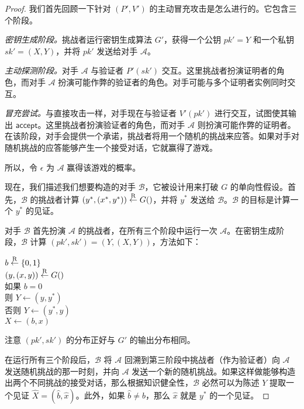 \begin{proof}
我们首先回顾一下针对 $(P',V')$ 的主动冒充攻击是怎么进行的。它包含三个阶段。

\emph{密钥生成阶段。}挑战者运行密钥生成算法 $G'$，获得一个公钥 $pk'=Y$ 和一个私钥 $sk'=(X,Y)$，并将 $pk'$ 发送给对手 $\mathcal{A}$。

\emph{主动探测阶段。}对手 $\mathcal{A}$ 与验证者 $P'(sk')$ 交互。这里挑战者扮演证明者的角色，而对手 $\mathcal{A}$ 扮演可能作弊的验证者的角色。对手可能与多个证明者实例同时交互。

\emph{冒充尝试。}与直接攻击一样，对手现在与验证者 $V'(pk')$ 进行交互，试图使其输出 $\mathsf{accept}$。这里挑战者扮演验证者的角色，而对手 $\mathcal{A}$ 则扮演可能作弊的证明者。在该阶段，对手会提供一个承诺，挑战者将用一个随机的挑战来应答。如果对手对随机挑战的应答能够产生一个接受对话，它就赢得了游戏。

所以，令 $\epsilon$ 为 $\mathcal{A}$ 赢得该游戏的概率。

现在，我们描述我们想要构造的对手 $\mathcal{B}$，它被设计用来打破 $G$ 的单向性假设。首先，$\mathcal{B}$ 的挑战者计算 $(y^*,(x^*,y^*))\overset{\rm R}\leftarrow G()$，并将 $y^*$ 发送给 $\mathcal{B}$。$\mathcal{B}$ 的目标是计算一个 $y^*$ 的见证。

对手 $\mathcal{B}$ 首先扮演 $\mathcal{A}$ 的挑战者，在所有三个阶段中运行一次 $\mathcal{A}$。在密钥生成阶段，$\mathcal{B}$ 计算 $(pk',sk')=(Y,(X,Y))$，方法如下：

\vspace{8pt}

\hspace*{40pt} $b\overset{\rm R}\leftarrow\{0,1\}$\\
\hspace*{62pt} $(y,(x,y))\overset{\rm R}\leftarrow G()$\\
\hspace*{62pt} 如果 $b=0$\\
\hspace*{82pt} 则 $Y\leftarrow(y,y^*)$\\
\hspace*{82pt} 否则 $Y\leftarrow(y^*,y)$\\
\hspace*{62pt} $X\leftarrow(b,x)$

\vspace{8pt}

\noindent
注意 $(pk',sk')$ 的分布正好与 $G'$ 的输出分布相同。

在运行所有三个阶段后，$\mathcal{B}$ 将 $\mathcal{A}$ 回溯到第三阶段中挑战者（作为验证者）向 $\mathcal{A}$ 发送随机挑战的那一时刻，并向 $\mathcal{A}$ 发送一个新的随机挑战。如果这样做能够构造出两个不同挑战的接受对话，那么根据知识健全性，$\mathcal{B}$ 必然可以为陈述 $Y$ 提取一个见证 $\widehat X=(\hat b,\hat x)$。此外，如果 $\hat b\neq b$，那么 $\hat x$ 就是 $y^*$ 的一个见证。


\end{proof}
